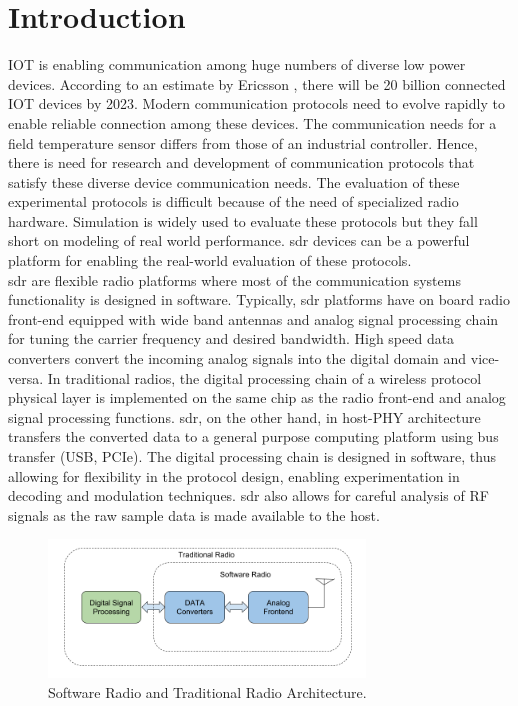 \chapter{Introduction}
\ac{IOT} is enabling communication among huge numbers of diverse low power devices.  
According to an estimate by Ericsson \cite{noauthor_internet_2017}, there will be 20 billion connected \ac{IOT} devices by 2023.
Modern communication protocols need to evolve rapidly to enable reliable connection among these devices.
The communication needs for a field temperature sensor differs from those of an industrial controller. 
Hence, there is need for research and development of communication protocols that satisfy these diverse device communication needs. 
The evaluation of these experimental protocols is difficult because of the need of specialized radio hardware.
Simulation is widely used to evaluate these protocols but they fall short on modeling of real world performance.
\ac{sdr} devices can be a powerful platform for enabling the real-world evaluation of these protocols.\\

\ac{sdr} are flexible radio platforms where most of the communication systems functionality is designed in software. Typically, \ac{sdr} platforms have on board radio front-end equipped with wide band antennas and analog signal processing chain for tuning the carrier frequency and desired bandwidth. High speed data converters convert the incoming analog signals into the digital domain and vice-versa. In traditional radios, the digital processing chain of a wireless protocol physical layer is implemented on the same chip as the radio front-end and analog signal processing functions. \ac{sdr}, on the other hand, in host-PHY \cite{nychis_enabling_nodate} architecture transfers the converted data to a general purpose computing platform using bus transfer (USB, PCIe).  The digital processing chain is designed in software, thus allowing for flexibility in the protocol design, enabling experimentation in decoding and modulation techniques. \ac{sdr} also allows for careful analysis of RF signals as the raw sample data is made available to the host.\\

\begin{figure}[!h]
\centering
\includegraphics[width=0.75\textwidth]{Figure/SDRSystem.png}
\caption{Software Radio and Traditional Radio Architecture.}
\label{sdr_architecture}
\end{figure}


